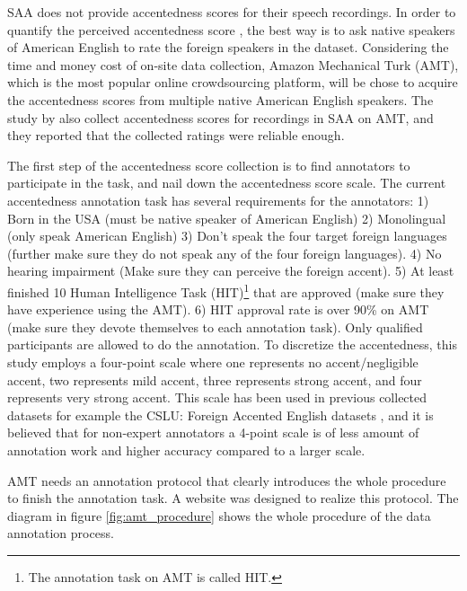 SAA does not provide accentedness scores for their speech recordings. In order to quantify the perceived accentedness score , the best way is to ask native speakers of American English to rate the foreign speakers in the dataset. Considering the time and money cost of on-site data collection, Amazon Mechanical Turk (AMT), which is the most popular online crowdsourcing platform, will be chose to acquire the accentedness scores from multiple native American English speakers. The study by \cite{kunath2010wisdom} also collect accentedness scores for recordings in SAA on AMT, and they reported that the collected ratings were reliable enough.

The first step of the accentedness score collection is to find annotators to participate in the task, and nail down the accentedness score scale. The current accentedness annotation task has several requirements for the annotators: 1) Born in the USA (must be native speaker of American English) 2) Monolingual (only speak American English) 3) Don't speak the four target foreign languages (further make sure they do not speak any of the four foreign languages). 4) No hearing impairment (Make sure they can perceive the foreign accent). 5) At least finished 10 Human Intelligence Task (HIT)\footnote{The annotation task on AMT is called HIT.} that are approved (make sure they have experience using the AMT). 6) HIT approval rate is over 90\% on AMT (make sure they devote themselves to each annotation task). Only qualified participants are allowed to do the annotation. To discretize the accentedness, this study employs a four-point scale where one represents no accent/negligible accent, two represents mild accent, three represents strong accent, and four represents very strong accent. This scale has been used in previous collected datasets for example the CSLU: Foreign Accented English datasets \citep{choueiter2008empirical}, and it is believed that for non-expert annotators a 4-point scale is of less amount of annotation work and higher accuracy compared to a larger scale.

AMT needs an annotation protocol that clearly introduces the whole procedure to finish the annotation task. A website was designed to realize this protocol. The diagram in figure \ref{fig:amt_procedure} shows the whole procedure of the data annotation process.

